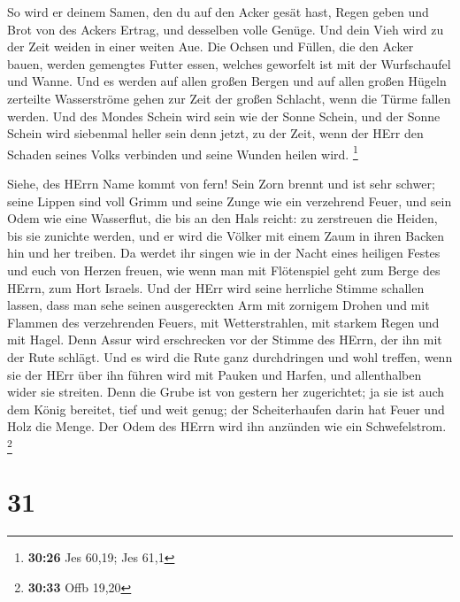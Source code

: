  So wird er deinem Samen, den du auf den Acker gesät hast,
Regen geben und Brot von des Ackers Ertrag, und desselben volle Genüge.
Und dein Vieh wird zu der Zeit weiden in einer weiten Aue. 
Die Ochsen und Füllen, die den Acker bauen, werden gemengtes Futter
essen, welches geworfelt ist mit der Wurfschaufel und Wanne.
 Und es werden auf allen großen Bergen und auf allen großen
Hügeln zerteilte Wasserströme gehen zur Zeit der großen Schlacht, wenn
die Türme fallen werden.  Und des Mondes Schein wird sein
wie der Sonne Schein, und der Sonne Schein wird siebenmal heller sein
denn jetzt, zu der Zeit, wenn der HErr den Schaden seines Volks
verbinden und seine Wunden heilen wird. \footnote{\textbf{30:26} Jes
  60,19; Jes 61,1}

 Siehe, des HErrn Name kommt von fern! Sein Zorn brennt und
ist sehr schwer; seine Lippen sind voll Grimm und seine Zunge wie ein
verzehrend Feuer,  und sein Odem wie eine Wasserflut, die
bis an den Hals reicht: zu zerstreuen die Heiden, bis sie zunichte
werden, und er wird die Völker mit einem Zaum in ihren Backen hin und
her treiben.  Da werdet ihr singen wie in der Nacht eines
heiligen Festes und euch von Herzen freuen, wie wenn man mit Flötenspiel
geht zum Berge des HErrn, zum Hort Israels.  Und der HErr
wird seine herrliche Stimme schallen lassen, dass man sehe seinen
ausgereckten Arm mit zornigem Drohen und mit Flammen des verzehrenden
Feuers, mit Wetterstrahlen, mit starkem Regen und mit Hagel.
 Denn Assur wird erschrecken vor der Stimme des HErrn, der
ihn mit der Rute schlägt.  Und es wird die Rute ganz
durchdringen und wohl treffen, wenn sie der HErr über ihn führen wird
mit Pauken und Harfen, und allenthalben wider sie streiten.
 Denn die Grube ist von gestern her zugerichtet; ja sie ist
auch dem König bereitet, tief und weit genug; der Scheiterhaufen darin
hat Feuer und Holz die Menge. Der Odem des HErrn wird ihn anzünden wie
ein Schwefelstrom. \footnote{\textbf{30:33} Offb 19,20}

\hypertarget{section-12}{%
\section{31}\label{section-12}}

